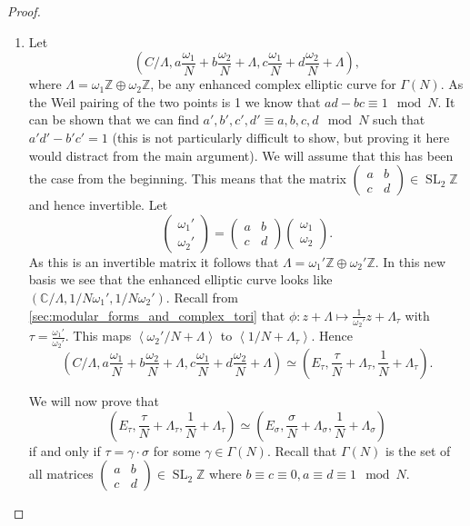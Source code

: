 \documentclass[titlepage,a4paper]{article}
\theoremstyle{theoremdd}
\theoremstyle{definitiondd}
\theoremstyle{remarkdd}
\newcommand{\Z}{\mathbb{Z}}
\newcommand{\C}{\mathbb{C}}
\DeclareMathOperator{\SL}{SL}
\begin{document}
\begin{proof}
\begin{enumerate}
	\item Let 
		\[\left( C / \Lambda, a \frac{\omega_1}{N} + b \frac{\omega_2}{N} + \Lambda,  c \frac{\omega_1}{N}  + d \frac{\omega_2}{N}  + \Lambda \right) ,\]
	where $\Lambda = \omega_1 \Z \oplus \omega_2 \Z$, be any enhanced complex elliptic curve for $\Gamma(N)$.
	As the Weil pairing of the two points is 1 we know that $ad - bc \equiv 1 \mod N $. 
	It can be shown that we can find $a', b', c', d' \equiv a, b, c, d \mod N$ such that  $a'd' - b'c' = 1$ (this is not particularly difficult to show, but proving it here would distract from the main argument). 
	We will assume that this has been the case from the beginning.  This means that the matrix  $\begin{pmatrix} a & b \\ c& d \end{pmatrix}  \in \SL_2\Z$ and hence invertible.  Let \[
		\begin{pmatrix} \omega_1' \\ \omega_2' \end{pmatrix}  = 
		\begin{pmatrix} a & b \\ c & d \end{pmatrix} 
		\begin{pmatrix} \omega_1 \\ \omega_2 \end{pmatrix} 
	.\] 
	As this is an invertible matrix it follows that $\Lambda = \omega_1' \Z \oplus \omega_2' \Z$. 
	In this new basis we see that the enhanced elliptic curve looks like $(\C / \Lambda, 1 / N \omega_1',  1 / N \omega_2')$.
	Recall from \cref{sec:modular_forms_and_complex_tori} that  $\phi: z  + \Lambda \mapsto  \frac{1}{\omega_2'} z + \Lambda_\tau$ with $\tau = \frac{\omega_1'}{\omega_2'}$. 
	This maps  $\left<\omega_2' / N  + \Lambda \right>$ to $\left<1 / N + \Lambda_\tau \right>$.
	Hence  \[
		\left( C / \Lambda, a \frac{\omega_1}{N} + b \frac{\omega_2}{N} + \Lambda,  c \frac{\omega_1}{N}  + d \frac{\omega_2}{N}  + \Lambda \right)
		\simeq
		\left( E_\tau, \frac{\tau}{N} + \Lambda_\tau, \frac{1}{N} + \Lambda_\tau \right)
	.\] 

	We will now prove that \[
		\left( E_\tau , \frac{\tau}{N} + \Lambda_\tau, \frac{1}{N} + \Lambda_\tau \right) \simeq 
		\left( E_\sigma, \frac{\sigma}{N} + \Lambda_ \sigma, \frac{1}{N} + \Lambda_\sigma \right) 
	\]
	if and only if $\tau = \gamma \cdot \sigma$ for some $\gamma \in \Gamma(N)$.
	Recall that $\Gamma(N)$ is the set of all matrices $\begin{pmatrix} a & b \\ c & d \end{pmatrix} \in \SL_2\Z$ where $b \equiv c \equiv 0, a \equiv d \equiv 1 \mod N$. 


\end{enumerate}
\end{proof}
\end{document}
